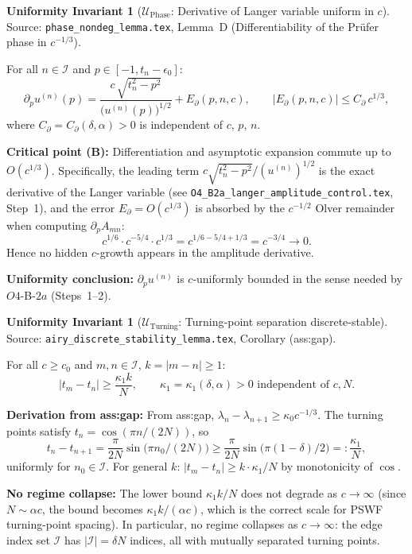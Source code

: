 \documentclass[12pt,a4paper]{amsart}
\theoremstyle{definition}
\newtheorem{invariant}[theorem]{Uniformity Invariant}
\newcommand{\Uph}{\mathcal{U}_{\mathrm{Phase}}}
\newcommand{\Utp}{\mathcal{U}_{\mathrm{Turning}}}
\newcommand{\abs}[1]{\left|#1\right|}
\begin{document}
\begin{invariant}[$\Uph$: Derivative of Langer variable uniform in $c$]
\label{inv:phase}
Source: \texttt{phase\_nondeg\_lemma.tex}, Lemma~D
(Differentiability of the Pr\"ufer phase in $c^{-1/3}$).

\medskip
For all $n \in \mathcal{I}$ and $p \in [-1, t_n - \epsilon_0]$:
\[
  \partial_p u^{(n)}(p)
  = \frac{c\,\sqrt{t_n^2 - p^2}}{\bigl(u^{(n)}(p)\bigr)^{1/2}}
  + E_\partial(p, n, c),
  \qquad
  \abs{E_\partial(p,n,c)} \leq C_\partial\, c^{1/3},
\]
where $C_\partial = C_\partial(\delta, \alpha) > 0$ is independent of $c$, $p$, $n$.

\medskip
\noindent\textbf{Critical point (B):}
Differentiation and asymptotic expansion commute up to $O(c^{1/3})$.
Specifically, the leading term
$c\sqrt{t_n^2-p^2}/(u^{(n)})^{1/2}$
is the exact derivative of the Langer variable (see
\texttt{O4\_B2a\_langer\_amplitude\_control.tex}, Step~1),
and the error $E_\partial = O(c^{1/3})$ is absorbed by the
$c^{-1/2}$ Olver remainder when computing $\partial_p A_{mn}$:
\[
  c^{1/6}\cdot c^{-5/4} \cdot c^{1/3} = c^{1/6-5/4+1/3} = c^{-3/4} \to 0.
\]
Hence no hidden $c$-growth appears in the amplitude derivative.

\medskip
\noindent\textbf{Uniformity conclusion:}
$\partial_p u^{(n)}$ is $c$-uniformly bounded
in the sense needed by $O4$-B-$2a$ (Steps~1--2).
\end{invariant}

\begin{invariant}[$\Utp$: Turning-point separation discrete-stable]
\label{inv:turning}
Source: \texttt{airy\_discrete\_stability\_lemma.tex},
Corollary (ass:gap).

\medskip
For all $c \geq c_0$ and $m, n \in \mathcal{I}$, $k = |m-n| \geq 1$:
\[
  \abs{t_m - t_n} \geq \frac{\kappa_1 k}{N},
  \qquad
  \kappa_1 = \kappa_1(\delta, \alpha) > 0 \text{ independent of } c, N.
\]

\medskip
\noindent\textbf{Derivation from ass:gap:}
From ass:gap, $\lambda_n - \lambda_{n+1} \geq \kappa_0 c^{-1/3}$.
The turning points satisfy $t_n = \cos(\pi n/(2N))$,
so
\[
  t_n - t_{n+1}
  = \frac{\pi}{2N}\sin\bigl(\pi n_0/(2N)\bigr)
  \geq \frac{\pi}{2N}\sin\bigl(\pi(1-\delta)/2\bigr)
  =: \frac{\kappa_1}{N},
\]
uniformly for $n_0 \in \mathcal{I}$.
For general $k$: $|t_m - t_n| \geq k \cdot \kappa_1/N$ by monotonicity of $\cos$.

\medskip
\noindent\textbf{No regime collapse:}
The lower bound $\kappa_1 k/N$ does not degrade as $c \to \infty$
(since $N \sim \alpha c$, the bound becomes $\kappa_1 k/(\alpha c)$,
which is the correct scale for PSWF turning-point spacing).
In particular, no regime collapses as $c \to \infty$:
the edge index set $\mathcal{I}$ has $|\mathcal{I}| = \delta N$ indices,
all with mutually separated turning points.
\end{invariant}
\end{document}
